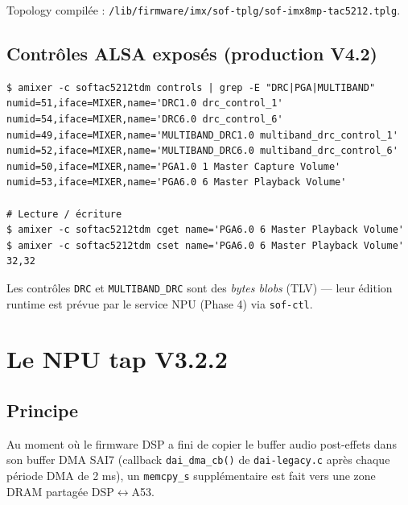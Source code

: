 \documentclass[11pt,a4paper]{article}
\begin{document}
Topology compilée : \texttt{/lib/firmware/imx/sof-tplg/sof-imx8mp-tac5212.tplg}.

\subsection{Contrôles ALSA exposés (production V4.2)}

\begin{lstlisting}
$ amixer -c softac5212tdm controls | grep -E "DRC|PGA|MULTIBAND"
numid=51,iface=MIXER,name='DRC1.0 drc_control_1'
numid=54,iface=MIXER,name='DRC6.0 drc_control_6'
numid=49,iface=MIXER,name='MULTIBAND_DRC1.0 multiband_drc_control_1'
numid=52,iface=MIXER,name='MULTIBAND_DRC6.0 multiband_drc_control_6'
numid=50,iface=MIXER,name='PGA1.0 1 Master Capture Volume'
numid=53,iface=MIXER,name='PGA6.0 6 Master Playback Volume'

# Lecture / écriture
$ amixer -c softac5212tdm cget name='PGA6.0 6 Master Playback Volume'
$ amixer -c softac5212tdm cset name='PGA6.0 6 Master Playback Volume' 32,32
\end{lstlisting}

Les contrôles \texttt{DRC} et \texttt{MULTIBAND\_DRC} sont des
\emph{bytes blobs} (TLV) — leur édition runtime est prévue par le service NPU
(Phase 4) via \texttt{sof-ctl}.

\section{Le NPU tap V3.2.2}

\subsection{Principe}

Au moment où le firmware DSP a fini de copier le buffer audio post-effets
dans son buffer DMA SAI7 (callback \texttt{dai\_dma\_cb()} de
\texttt{dai-legacy.c} après chaque période DMA de 2 ms), un \texttt{memcpy\_s}
supplémentaire est fait vers une zone DRAM partagée DSP$\leftrightarrow$A53.
\end{document}
